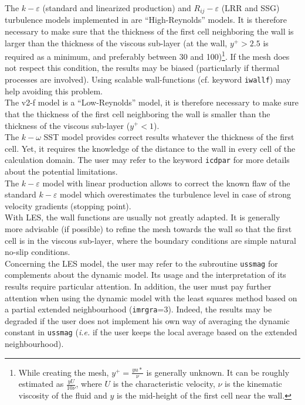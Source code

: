 The $k-\varepsilon$ (standard and linearized production) and $R_{ij}-\varepsilon$
(LRR and SSG) turbulence
models implemented in \CS are ``High-Reynolds'' models. It is therefore
necessary to make sure that the thickness of the first cell neighboring
the wall is larger than the thickness of the viscous sub-layer (at the
wall, $y^+>2.5$ is required as a minimum, and preferably between 30 and
100)\footnote{While creating the mesh, $y^+=\frac{yu*}{\nu}$ is
generally unknown. It can be roughly estimated as $\frac{yU}{10\nu}$, where
$U$ is the characteristic velocity, $\nu$ is the kinematic viscosity of the fluid
 and $y$ is the mid-height of the first cell near the wall.}. If the mesh does
 not respect this condition, the results may be biased
(particularly if thermal processes are involved). Using scalable wall-functions
(cf. keyword {\tt iwallf}) may help avoiding this problem.\\
The v2-f model is a ``Low-Reynolds'' model, it is therefore necessary to
make sure that the thickness of the first cell neighboring the wall is
smaller than the thickness of the viscous sub-layer ($y^+<1$).\\
The $k-\omega$ SST model provides correct results whatever the thickness of the first cell.
Yet, it requires the knowledge of the distance to the wall in every
cell of the calculation domain. The user may refer to the keyword
{\tt icdpar} for more details about the potential limitations.\\
The $k-\varepsilon$ model with linear production allows to correct the
known flaw of the standard $k-\varepsilon$ model which overestimates the
turbulence level in case of strong velocity gradients (stopping point).\\
With LES, the wall functions are usually not greatly adapted. It is generally more advisable
(if possible) to refine the mesh towards the wall so that the first cell is in the
viscous sub-layer, where the boundary conditions are simple natural no-slip conditions.\\
Concerning the LES model, the user may refer to the subroutine
\texttt{ussmag} for complements about the dynamic model. Its usage
and the interpretation of its results require particular attention.
In addition, the user must pay further attention when using the dynamic
model with the least squares method based on a partial extended
neighbourhood ({\tt imrgra}=3). Indeed, the results may be degraded if the user
does not implement his own way of averaging the dynamic constant in
\texttt{ussmag} (\textit{i.e.} if the user keeps the local average based
on the extended neighbourhood).\\

